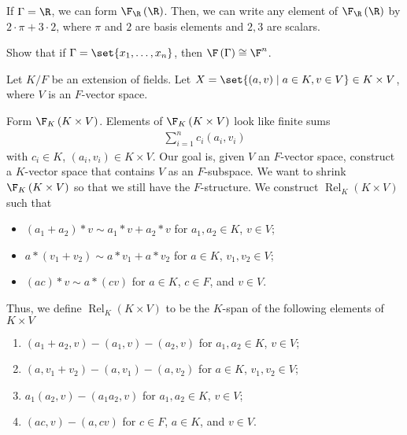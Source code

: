 \documentclass[10pt]{mypackage}
\begin{document}
\begin{example}
  If $\Gamma = \R$, we can form $\F_{\R}\left(\R\right)$. Then, we can write any element of $\F_{\R}\left(\R\right)$ by $2\cdot \pi + 3\cdot 2$, where $\pi$ and $2$ are basis elements and $2,3$ are scalars.
\end{example}
\begin{exercise}
  Show that if $\Gamma = \set{x_1,\dots,x_n}$, then $\F\left(\Gamma\right) \cong \F^{n}$.
\end{exercise}
\begin{definition}
  Let $K/F$ be an extension of fields. Let $X = \set{\left(a,v\right)\mid a\in K,v\in V}\in K\times V$, where $V$ is an $F$-vector space.\newline

  Form $\F_{K}\left(K\times V\right)$. Elements of $\F_{K}\left(K\times V\right)$ look like finite sums
  \begin{align*}
    \sum_{i=1}^{n}c_i\left(a_i,v_i\right)
  \end{align*}
  with $c_i\in K$, $\left(a_i,v_i\right)\in K\times V$.
  Our goal is, given $V$ an $F$-vector space, construct a $K$-vector space that contains $V$ as an $F$-subspace. We want to shrink $\F_{K}\left(K\times V\right)$ so that we still have the $F$-structure. We construct $\operatorname{Rel}_{K}\left(K\times V\right)$ such that
  \begin{itemize}
    \item $\left(a_1 + a_2\right)\ast v \sim a_1\ast v + a_2\ast v$ for $a_1,a_2\in K$, $v\in V$;
    \item $a\ast \left(v_1 + v_2\right) \sim a\ast v_1 + a\ast v_2$ for $a\in K$, $v_1,v_2\in V$;
    \item $\left(ac\right)\ast v \sim a\ast \left(cv\right)$ for $a\in K$, $c\in F$, and $v\in V$.
  \end{itemize}
  Thus, we define $\operatorname{Rel}_{K}\left(K\times V\right)$ to be the $K$-span of the following elements of $K\times V$
  \begin{enumerate}[(1)]
    \item $\left(a_1 + a_2,v\right) - \left(a_1,v\right) - \left(a_2,v\right)$ for $a_1,a_2\in K$, $v\in V$;
    \item $\left(a,v_1 + v_2\right) - \left(a,v_1\right) - \left(a,v_2\right)$ for $a\in K$, $v_1,v_2\in V$;
    \item $a_1\left(a_2,v\right) - \left(a_1a_2,v\right)$ for $a_1,a_2\in K$, $v\in V$;
    \item $\left(ac,v\right)-\left(a,cv\right)$ for $c\in F$, $a\in K$, and $v\in V$.

\end{enumerate}
\end{definition}
\end{document}
